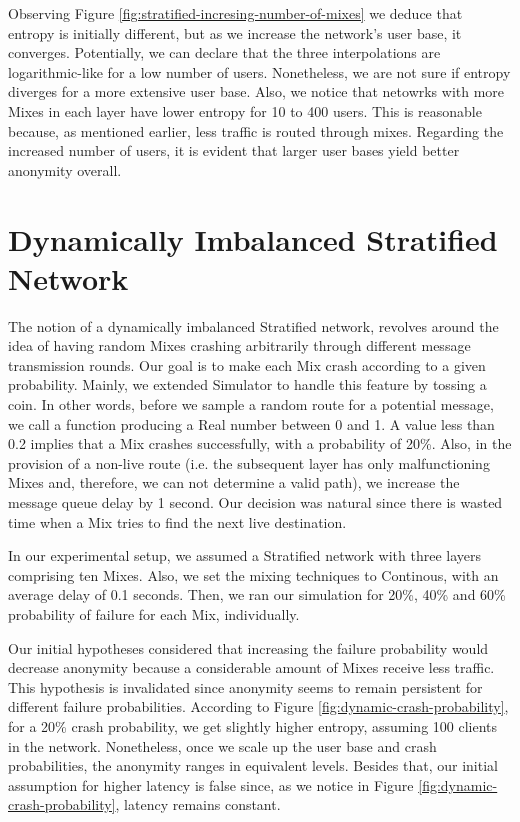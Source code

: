 \documentclass[logo,msc,cyber]{infthesis}   %
\begin{document}
Observing Figure \ref{fig:stratified-incresing-number-of-mixes} we
deduce that entropy is initially different, but as we increase the network's
user base, it converges. Potentially, we can declare that the three
interpolations are logarithmic-like for a low number of users. Nonetheless, we
are not sure if entropy diverges for a more extensive user base. Also, we notice
that netowrks with more Mixes in each layer have lower entropy for 10 to 400
users. This is reasonable because, as mentioned earlier, less traffic is routed
through mixes. Regarding the increased number of users, it is evident that
larger user bases yield better anonymity overall.


\section{Dynamically Imbalanced Stratified Network}
The notion of a dynamically imbalanced Stratified network, revolves around the
idea of having random Mixes crashing arbitrarily through different message
transmission rounds. Our goal is to make each Mix crash according to a given
probability. Mainly, we extended Simulator to handle this feature by tossing a
coin. In other words, before we sample a random route for a potential message,
we call a function producing a Real number between 0 and 1. A value less than
0.2 implies that a Mix crashes successfully, with a probability of 20\%. Also,
in the provision of a non-live route (i.e. the subsequent layer has only
malfunctioning Mixes and, therefore, we can not determine a valid path), we
increase the message queue delay by 1 second. Our decision was natural since
there is wasted time when a Mix tries to find the next live destination.

In our experimental setup, we assumed a Stratified network with three layers
comprising ten Mixes. Also, we set the mixing techniques to Continous, with an
average delay of 0.1 seconds. Then, we ran our simulation for 20\%, 40\% and 60\%
probability of failure for each Mix, individually. 

Our initial hypotheses considered that increasing the failure probability would
decrease anonymity because a considerable amount of Mixes receive less traffic.
This hypothesis is invalidated since anonymity seems to remain persistent for
different failure probabilities. According to Figure
\ref{fig:dynamic-crash-probability}, for a 20\% crash probability, we get
slightly higher entropy, assuming 100 clients in the network. Nonetheless, once
we scale up the user base and crash probabilities, the anonymity ranges in
equivalent levels. Besides that, our initial assumption for higher latency is
false since, as we notice in Figure \ref{fig:dynamic-crash-probability}, latency
remains constant. 
\end{document}
